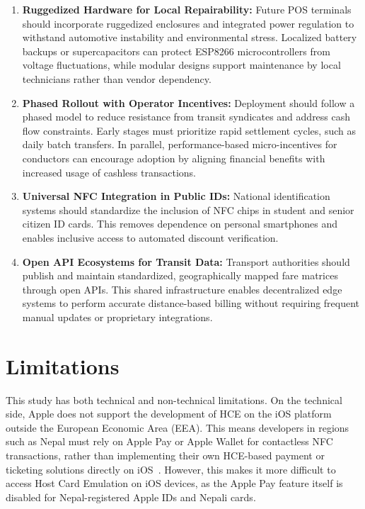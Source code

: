 \documentclass[manuscript,review,anonymous]{acmart}
\begin{document}
\begin{enumerate}

  \item \textbf{Ruggedized Hardware for Local Repairability:} Future POS terminals should incorporate ruggedized enclosures and integrated power regulation to withstand automotive instability and environmental stress. Localized battery backups or supercapacitors can protect ESP8266 microcontrollers from voltage fluctuations, while modular designs support maintenance by local technicians rather than vendor dependency.
  \item \textbf{Phased Rollout with Operator Incentives:} Deployment should follow a phased model to reduce resistance from transit syndicates and address cash flow constraints. Early stages must prioritize rapid settlement cycles, such as daily batch transfers. In parallel, performance-based micro-incentives for conductors can encourage adoption by aligning financial benefits with increased usage of cashless transactions.
  \item \textbf{Universal NFC Integration in Public IDs:} National identification systems should standardize the inclusion of NFC chips in student and senior citizen ID cards. This removes dependence on personal smartphones and enables inclusive access to automated discount verification.
  \item \textbf{Open API Ecosystems for Transit Data:} Transport authorities should publish and maintain standardized, geographically mapped fare matrices through open APIs. This shared infrastructure enables decentralized edge systems to perform accurate distance-based billing without requiring frequent manual updates or proprietary integrations.
\end{enumerate}

\section{Limitations}
This study has both technical and non-technical limitations. On the technical side, Apple does not support the development of HCE on the iOS platform outside the European Economic Area (EEA). This means developers in regions such as Nepal must rely on Apple Pay or Apple Wallet for contactless NFC transactions, rather than implementing their own HCE-based payment or ticketing solutions directly on iOS~\cite{apple2024hce}. However, this makes it more difficult to access Host Card Emulation on iOS devices, as the Apple Pay feature itself is disabled for Nepal-registered Apple IDs and Nepali cards. 
\end{document}
